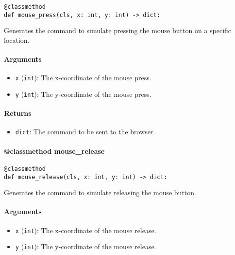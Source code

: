\documentclass{article}
\begin{document}
\begin{lstlisting}[style=pythonstyle]
@classmethod
def mouse_press(cls, x: int, y: int) -> dict:
\end{lstlisting}

\noindent Generates the command to simulate pressing the mouse button on a specific location.

\paragraph{Arguments}

\begin{itemize}
    \item \lstinline[style=pythonstyle]|x| (\lstinline[style=pythonstyle]|int|): The x-coordinate of the mouse press.
    \item \lstinline[style=pythonstyle]|y| (\lstinline[style=pythonstyle]|int|): The y-coordinate of the mouse press.
\end{itemize}

\paragraph{Returns}

\begin{itemize}
    \item \lstinline[style=pythonstyle]|dict|: The command to be sent to the browser.
\end{itemize}

\paragraph{@classmethod mouse\_release}

\begin{lstlisting}[style=pythonstyle]
@classmethod
def mouse_release(cls, x: int, y: int) -> dict:
\end{lstlisting}

\noindent Generates the command to simulate releasing the mouse button.

\paragraph{Arguments}

\begin{itemize}
    \item \lstinline[style=pythonstyle]|x| (\lstinline[style=pythonstyle]|int|): The x-coordinate of the mouse release.
    \item \lstinline[style=pythonstyle]|y| (\lstinline[style=pythonstyle]|int|): The y-coordinate of the mouse release.
\end{itemize}
\end{document}
